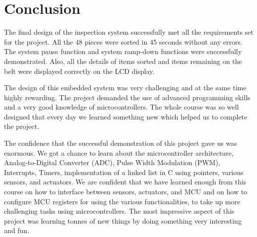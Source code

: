 \section{Conclusion}\label{sec:conclusion}
The final design of the inspection system successfully met all the requirements set for the project. All the 48 pieces were sorted in 45 seconds without any errors. The system pause function and system ramp-down functions were successfully demonstrated. Also, all the details of items sorted and items remaining on the belt were displayed correctly on the LCD display.

The design of this embedded system was very challenging and at the same time highly rewarding. The project demanded the use of advanced programming skills and a very good knowledge of microcontrollers. The whole course was so well designed that every day we learned something new which helped us to complete the project.

The confidence that the successful demonstration of this project gave us was enormous. We got a chance to learn about the microcontroller architecture, Analog-to-Digital Converter (ADC), Pulse Width Modulation (PWM), Interrupts, Timers, implementation of a linked list in C using pointers, various sensors, and actuators. We are confident that we have learned enough from this course on how to interface between sensors, actuators, and MCU and on how to configure MCU registers for using the various functionalities, to take up more challenging tasks using microcontrollers. The most impressive aspect of this project was learning tonnes of new things by doing something very interesting and fun.
